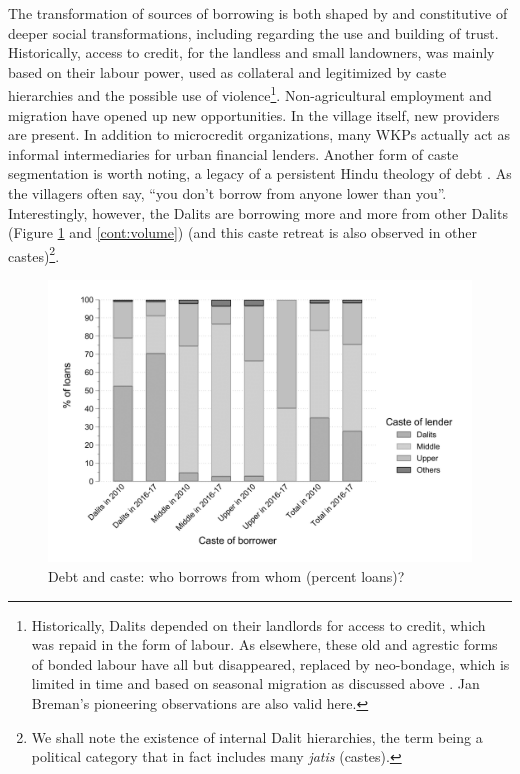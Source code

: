 \documentclass[a4paper, 11pt, onecolumn]{article}
\begin{document}
The transformation of sources of borrowing is both shaped by and constitutive of deeper social transformations, including regarding the use and building of trust.
Historically, access to credit, for the landless and small landowners, was mainly based on their labour power, used as collateral and legitimized by caste hierarchies and the possible use of violence\footnote{Historically, Dalits depended on their landlords for access to credit, which was repaid in the form of labour. As elsewhere, these old and agrestic forms of bonded labour have all but disappeared, replaced by neo-bondage, which is limited in time and based on seasonal migration as discussed above \citep{Breman1974}. Jan Breman's pioneering observations are also valid here.}. 
Non-agricultural employment and migration have opened up new opportunities. 
In the village itself, new providers are present. 
In addition to microcredit organizations, many WKPs actually act as informal intermediaries for urban financial lenders. 
Another form of caste segmentation is worth noting, a legacy of a persistent Hindu theology of debt \citep{Kane2012}. 
As the villagers often say, ``you don't borrow from anyone lower than you''. 
Interestingly, however, the Dalits are borrowing more and more from other Dalits (Figure \ref{cont:loans} and \ref{cont:volume}) (and this caste retreat is also observed in other castes)\footnote{We shall note the existence of internal Dalit hierarchies, the term being a political category that in fact includes many \textit{jatis} (castes).}.  

\begin{figure}[h!]
\center
\includegraphics[width=12cm]{contengency_borrower_loan_stata.png}
\caption{Debt and caste: who borrows from whom (percent loans)?}
\label{cont:loans}
\end{figure}
\end{document}
